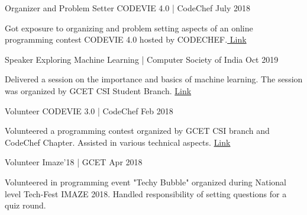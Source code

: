 

\begin{cventries}

  \cventry
    {Organizer and Problem Setter} %
    {CODEVIE 4.0 | CodeChef} %
    {} %
    {July 2018} %
    {
      \begin{cvitems} %
        \item {Got exposure to organizing and problem setting aspects of an online programming contest CODEVIE 4.0 hosted by CODECHEF.\href{https://www.codechef.com/COV42018}{ Link}
        }
      \end{cvitems}
    }

  \cventry
    {Speaker} %
    {Exploring Machine Learning | Computer Society of India} %
    {} %
    {Oct 2019} %
    {
      \begin{cvitems} %
        \item {Delivered a session on the importance and basics of machine learning. The session was organized by GCET CSI Student Branch. \href{https://drive.google.com/file/d/1VSwZUOWtNTnVfiDONBFNVpIrVZRuq-kI/view?usp=sharing}{  Link}}
      \end{cvitems}
    }

   \cventry
    {Volunteer} %
    {CODEVIE 3.0 | CodeChef} %
    {} %
    {Feb 2018} %
    {
      \begin{cvitems} %
        \item {Volunteered a programming contest organized by GCET CSI branch and CodeChef Chapter. Assisted in various technical aspects. \href{https://drive.google.com/file/d/1KsvBWcmMmWd7ItUhIyrPvH8vzJUS76EP/view?usp=sharing}{ Link}
        }
      \end{cvitems}
    }

  \cventry
     {Volunteer} %
    {Imaze'18 | GCET} %
    {} %
    {Apr 2018} %
    {
      \begin{cvitems} %
        \item {Volunteered in programming event "Techy Bubble" organized during National level Tech-Fest IMAZE 2018. Handled responsibility of setting questions for a quiz round.}
      \end{cvitems}
    }


\end{cventries}
